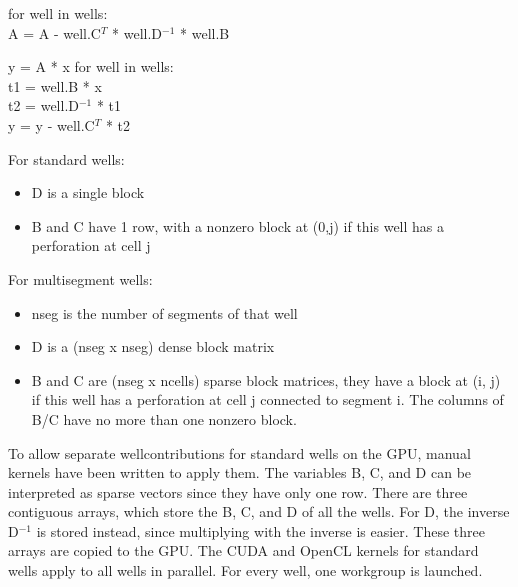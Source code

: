 \begin{algorithm}
\caption{Adding the wellcontributions to matrix A}
\begin{algorithmic}
\STATE for well in wells: \\
\STATE \hspace{0.5cm}A = A - well.C$^T$ * well.D$^{-1}$ * well.B \\
\end{algorithmic}
\label{alg:wells_coupled}
\end{algorithm}

\begin{algorithm}[H]
\caption{Adding the wellcontributions separately}
\begin{algorithmic}
\STATE y = A * x 
\STATE for well in wells: \\
\STATE \hspace{0.5cm}t1 = well.B * x \\
\STATE \hspace{0.5cm}t2 = well.D$^{-1}$ * t1 \\
\STATE \hspace{0.5cm}y = y - well.C$^{T}$ * t2 \\
\end{algorithmic}
\label{alg:wells_separate}
\end{algorithm}

For standard wells:
\begin{itemize}
\item D is a single block
\item B and C have 1 row, with a nonzero block at (0,j) if this well has a perforation at cell j
\end{itemize}

For multisegment wells:
\begin{itemize}
\item nseg is the number of segments of that well
\item D is a (nseg x nseg) dense block matrix
\item B and C are (nseg x ncells) sparse block matrices, they have a block at (i, j) if this well has a perforation at cell j connected to segment i. The columns of B/C have no more than one nonzero block.
\end{itemize}

To allow separate wellcontributions for standard wells on the GPU, manual kernels have been written to apply them.
The variables B, C, and D can be interpreted as sparse vectors since they have only one row.
There are three contiguous arrays, which store the B, C, and D of all the wells.
For D, the inverse D$^{-1}$ is stored instead, since multiplying with the inverse is easier.
These three arrays are copied to the GPU.
The CUDA and OpenCL kernels for standard wells apply to all wells in parallel.
For every well, one workgroup is launched.

